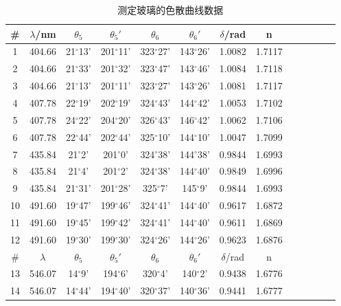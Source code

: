 \documentclass[a4paper,12pt,notitlepage]{article}
\begin{document}
\begin{center}
	\begin{longtable}{|c|c|c|c|c|c|c|c|c|c|c|c|c|}

	\caption{测定玻璃的色散曲线数据}	\\
	\hline
	\# & $\lambda$/nm & $\theta_5$ & $\theta_5'$ & $\theta_6$ & $\theta_6'$ & $\delta$/rad & n \\
	\hline
	1 & 404.66 & 21$^\circ$13' & 201$^\circ$11' & 323$^\circ$27' & 143$^\circ$26' & 1.0082 & 1.7117 \\
	\hline
	2 & 404.66 & 21$^\circ$33' & 201$^\circ$32' & 323$^\circ$47' & 143$^\circ$46' & 1.0084 & 1.7118 \\
	\hline
	3 & 404.66 & 21$^\circ$13' & 201$^\circ$11' & 323$^\circ$27' & 143$^\circ$26' & 1.0081 & 1.7117 \\
	\hline
	\hline
	4 & 407.78 & 22$^\circ$19' & 202$^\circ$19' & 324$^\circ$43' & 144$^\circ$42' & 1.0053 & 1.7102 \\
	\hline
	5 & 407.78 & 24$^\circ$22' & 204$^\circ$20' & 326$^\circ$43' & 146$^\circ$42' & 1.0062 & 1.7106 \\
	\hline
	6 & 407.78 & 22$^\circ$44' & 202$^\circ$44' & 325$^\circ$10' & 144$^\circ$10' & 1.0047 & 1.7099 \\
	\hline
	\hline
	7 & 435.84 & 21$^\circ$2' & 201$^\circ$0' & 324$^\circ$38' & 144$^\circ$38' & 0.9844 & 1.6993 \\
	\hline
	8 & 435.84 & 21$^\circ$4' & 201$^\circ$2' & 324$^\circ$38' & 144$^\circ$40' & 0.9849 & 1.6996 \\
	\hline
	9 & 435.84 & 21$^\circ$31' & 201$^\circ$28' & 325$^\circ$7' & 145$^\circ$9' & 0.9844 & 1.6993 \\
	\hline
	\hline
	10 & 491.60 & 19$^\circ$47' & 199$^\circ$46' & 324$^\circ$41' & 144$^\circ$40' & 0.9617 & 1.6872 \\
	\hline
	11 & 491.60 & 19$^\circ$45' & 199$^\circ$42' & 324$^\circ$41' & 144$^\circ$40' & 0.9611 & 1.6869 \\
	\hline
	12 & 491.60 & 19$^\circ$30' & 199$^\circ$30' & 324$^\circ$26' & 144$^\circ$26' & 0.9623 & 1.6876 \\
	\hline
	\hline
	\# & $\lambda$ & $\theta_5$ & $\theta_5'$ & $\theta_6$ & $\theta_6'$ & $\delta$/rad & n \\
	\hline
	13 & 546.07 & 14$^\circ$9' & 194$^\circ$6' & 320$^\circ$4' & 140$^\circ$2' & 0.9438 & 1.6776 \\
	\hline
	14 & 546.07 & 14$^\circ$44' & 194$^\circ$40' & 320$^\circ$37' & 140$^\circ$36' & 0.9441 & 1.6777 \\

\end{longtable}
\end{center}
\end{document}
